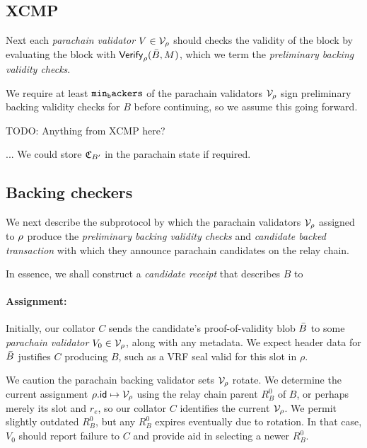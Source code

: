 \subsection{XCMP} 
\label{sec:xcmp}


Next each {\em parachain validator} $V \in \mathcal{V}_{\rho}$ should checks the validity of the block by evaluating the block with $\mathsf{Verify}_{\rho}(\bar{B},M)$, which we term the {\em preliminary backing validity checks}.  


We require at least $\mathtt{min_backers}$ of the parachain validators $\mathcal{V}_{\rho}$ sign preliminary backing validity checks for $B$ before continuing, so we assume this going forward.



TODO: Anything from XCMP here?




...  We could store $\mathfrak{C}_{B'}$ in the parachain state if required. 






\subsection{Backing checkers} %
\label{sec:backing_checks}

We next describe the subprotocol by which the parachain validators $\mathcal{V}_{\rho}$ assigned to $\rho$ produce the {\em preliminary backing validity checks} and {\em candidate backed transaction} with which they announce parachain candidates on the relay chain.

In essence, we shall construct a {\em candidate receipt} that describes $B$ to 

\smallskip\paragraph{Assignment:}

Initially, our collator $C$ sends the candidate's proof-of-validity blob $\bar{B}$ to some {\em parachain validator} $V_0 \in \mathcal{V}_{\rho}$, along with any metadata.  We expect header data for $\bar{B}$ justifies $C$ producing $B$, such as a VRF seal valid for this slot in $\rho$.

We caution the parachain backing validator sets $\mathcal{V}_{\rho}$ rotate.  We determine the current assignment $\rho.\mathsf{id} \mapsto \mathcal{V}_{\rho}$ using the relay chain parent $R^0_B$ of $B$, or perhaps merely its slot and $r_e$, so our collator $C$ identifies the current $\mathcal{V}_{\rho}$.  We permit slightly outdated $R^0_B$, but any $R^0_B$ expires eventually due to rotation.  In that case, $V_0$ should report failure to $C$ and provide aid in selecting a newer $R^0_B$. 

